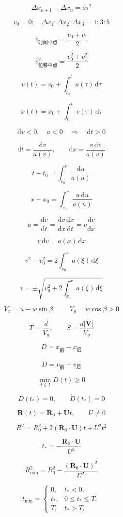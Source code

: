 \documentclass[12pt]{article}
\begin{document}
\[
\Delta x_{n+1}-\Delta x_n=a\tau^2
\]

\[
v_0=0:\quad\Delta x_1:\Delta x_2:\Delta x_3=1:3:5
\]

\[
v_{\text{时间中点}}=\frac{v_0+v_1}{2}
\]

\[
v_{\text{位移中点}}^2=\frac{v_0^2+v_1^2}{2}
\]

\[
v(t)=v_0+\int_{t_0}^t a(\tau)\,\mathrm d\tau
\]

\[
x(t)=x_0+\int_{t_0}^t v(\tau)\,\mathrm d\tau
\]

\[
\mathrm dv<0,\quad a<0\quad\Longrightarrow\quad\mathrm dt>0
\]

\[
\mathrm dt=\frac{\mathrm dv}{a(v)},\qquad\mathrm dx=\frac{v\,\mathrm dv}{a(v)}
\]

\[
t-t_0=\int_{v_0}^v\frac{\mathrm du}{a(u)}
\]

\[
x-x_0=\int_{v_0}^v\frac{u\,\mathrm du}{a(u)}
\]

\[
a=\frac{\mathrm dv}{\mathrm dt}=\frac{\mathrm dv}{\mathrm dx}\frac{\mathrm dx}{\mathrm dt}=v\frac{\mathrm dv}{\mathrm dx}
\]

\[
v\,\mathrm dv=a(x)\,\mathrm dx
\]

\[
\boxed{v^2-v_0^2=2\int_{x_0}^x a(\xi)\,\mathrm d\xi}
\]

\[
v=\pm\sqrt{v_0^2+2\int_{x_0}^x a(\xi)\,\mathrm d\xi}
\]

\[
V_x=u-w\sin\beta,\qquad V_y=w\cos\beta>0
\]

\[
T=\frac d{V_y},\qquad S=\frac{d|\bm V|}{V_y}
\]

\[
D=x_{\text{前}}-x_{\text{后}}
\]

\[
\dot D=v_{\text{前}}-v_{\text{后}}
\]

\[
\min_{t\in I}D(t)\ge0
\]

\[
D(t_*)=0,\qquad\dot D(t_*)=0
\]

\[
\bm R(t)=\bm R_0+\bm Ut,\qquad U\ne0
\]

\[
R^2=R_0^2+2(\bm R_0\cdot\bm U)t+U^2t^2
\]

\[
\boxed{t_*=-\frac{\bm R_0\cdot\bm U}{U^2}}
\]

\[
R_{\min}^2=R_0^2-\frac{(\bm R_0\cdot\bm U)^2}{U^2}
\]

\[
t_{\min}=\begin{cases}0,&t_*<0,\\t_*,&0\le t_*\le T,\\T,&t_*>T.\end{cases}
\]
\end{document}
